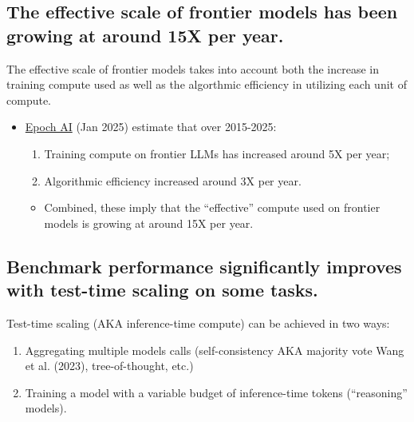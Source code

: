 \documentclass[
  letterpaper,
  DIV=11,
  numbers=noendperiod,
  oneside]{scrartcl}
\providecommand{\tightlist}{%
  \setlength{\itemsep}{0pt}\setlength{\parskip}{0pt}}
\begin{document}
\subsection{The effective scale of frontier models has been growing at
around 15X per
year.}\label{the-effective-scale-of-frontier-models-has-been-growing-at-around-15x-per-year.}

The effective scale of frontier models takes into account both the
increase in training compute used as well as the algorthmic efficiency
in utilizing each unit of compute.

\begin{itemize}
\tightlist
\item
  \href{https://epochai.org/trends}{Epoch AI} (Jan 2025) estimate that
  over 2015-2025:

  \begin{enumerate}
  \def\labelenumi{\arabic{enumi}.}
  \tightlist
  \item
    Training compute on frontier LLMs has increased around 5X per year;
  \item
    Algorithmic efficiency increased around 3X per year.
  \end{enumerate}

  \begin{itemize}
  \tightlist
  \item
    Combined, these imply that the ``effective'' compute used on
    frontier models is growing at around 15X per year.
  \end{itemize}
\end{itemize}

\subsection{Benchmark performance significantly improves with test-time
scaling on some
tasks.}\label{benchmark-performance-significantly-improves-with-test-time-scaling-on-some-tasks.}

Test-time scaling (AKA inference-time compute) can be achieved in two
ways:

\begin{enumerate}
\def\labelenumi{\arabic{enumi}.}
\tightlist
\item
  Aggregating multiple models calls (self-consistency AKA majority vote
  Wang et al. (2023), tree-of-thought, etc.)
\item
  Training a model with a variable budget of inference-time tokens
  (``reasoning'' models).
\end{enumerate}
\end{document}

